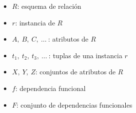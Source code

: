 \documentclass[preview]{standalone}
\begin{document}
\flushleft
\begin{itemize}
\item $R$: esquema de relación
\item $r$: instancia de $R$
\item $A,\ B,\ C,\ \ldots\ $: atributos de $R$
\item $t_1,\ t_2,\ t_3,\ \ldots\ $: tuplas de una instancia $r$ 
\item $X,\ Y,\ Z$: conjuntos de atributos de $R$
\item $f$: dependencia funcional
\item $F$: conjunto de dependencias funcionales
\end{itemize}
\end{document}
